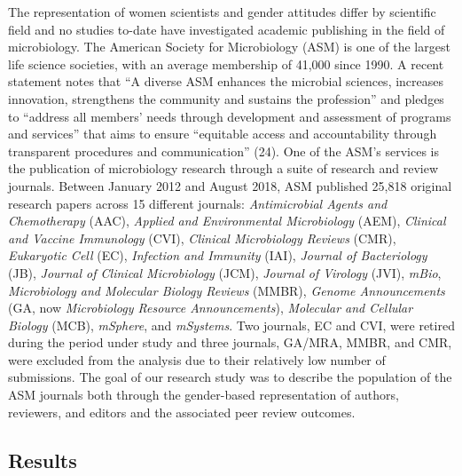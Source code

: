 \documentclass[11pt,]{article}
\begin{document}
The representation of women scientists and gender attitudes differ by
scientific field and no studies to-date have investigated academic
publishing in the field of microbiology. The American Society for
Microbiology (ASM) is one of the largest life science societies, with an
average membership of 41,000 since 1990. A recent statement notes that
``A diverse ASM enhances the microbial sciences, increases innovation,
strengthens the community and sustains the profession'' and pledges to
``address all members' needs through development and assessment of
programs and services'' that aims to ensure ``equitable access and
accountability through transparent procedures and communication'' (24).
One of the ASM's services is the publication of microbiology research
through a suite of research and review journals. Between January 2012
and August 2018, ASM published 25,818 original research papers across 15
different journals: \emph{Antimicrobial Agents and Chemotherapy} (AAC),
\emph{Applied and Environmental Microbiology} (AEM), \emph{Clinical and
Vaccine Immunology} (CVI), \emph{Clinical Microbiology Reviews} (CMR),
\emph{Eukaryotic Cell} (EC), \emph{Infection and Immunity} (IAI),
\emph{Journal of Bacteriology} (JB), \emph{Journal of Clinical
Microbiology} (JCM), \emph{Journal of Virology} (JVI), \emph{mBio},
\emph{Microbiology and Molecular Biology Reviews} (MMBR), \emph{Genome
Announcements} (GA, now \emph{Microbiology Resource Announcements}),
\emph{Molecular and Cellular Biology} (MCB), \emph{mSphere}, and
\emph{mSystems}. Two journals, EC and CVI, were retired during the
period under study and three journals, GA/MRA, MMBR, and CMR, were
excluded from the analysis due to their relatively low number of
submissions. The goal of our research study was to describe the
population of the ASM journals both through the gender-based
representation of authors, reviewers, and editors and the associated
peer review outcomes.

\hypertarget{results}{%
\subsection{Results}\label{results}}
\end{document}

